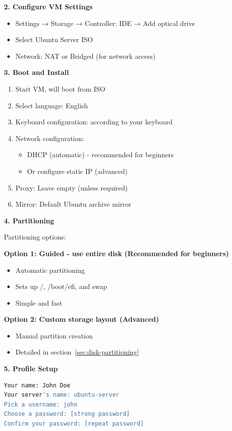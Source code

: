 \textbf{2. Configure VM Settings}

\begin{itemize}
    \item Settings → Storage → Controller: IDE → Add optical drive
    \item Select Ubuntu Server ISO
    \item Network: NAT or Bridged (for network access)
\end{itemize}

\textbf{3. Boot and Install}

\begin{enumerate}
    \item Start VM, will boot from ISO
    \item Select language: English
    \item Keyboard configuration: according to your keyboard
    \item Network configuration:
    \begin{itemize}
        \item DHCP (automatic) - recommended for beginners
        \item Or configure static IP (advanced)
    \end{itemize}
    \item Proxy: Leave empty (unless required)
    \item Mirror: Default Ubuntu archive mirror
\end{enumerate}

\textbf{4. Partitioning}

Partitioning options:

\textbf{Option 1: Guided - use entire disk (Recommended for beginners)}
\begin{itemize}
    \item Automatic partitioning
    \item Sets up /, /boot/efi, and swap
    \item Simple and fast
\end{itemize}

\textbf{Option 2: Custom storage layout (Advanced)}
\begin{itemize}
    \item Manual partition creation
    \item Detailed in section~\ref{sec:disk-partitioning}
\end{itemize}

\textbf{5. Profile Setup}

\begin{lstlisting}[language=bash, caption={User account information}]
Your name: John Doe
Your server's name: ubuntu-server
Pick a username: john
Choose a password: [strong password]
Confirm your password: [repeat password]
\end{lstlisting}

